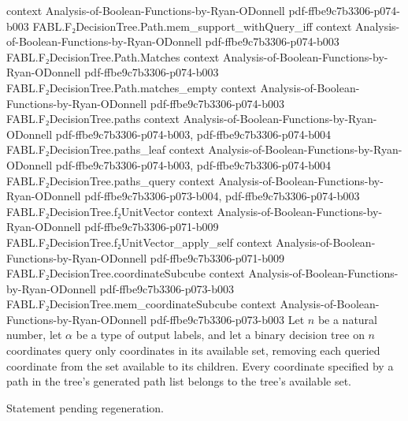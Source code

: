 \begin{theorem}
  {context}
  {Analysis-of-Boolean-Functions-by-Ryan-ODonnell}
  {pdf-ffbe9c7b3306-p074-b003}
\proofstep
  {FABL.F₂DecisionTree.Path.mem_support_withQuery_iff}
  {context}
  {Analysis-of-Boolean-Functions-by-Ryan-ODonnell}
  {pdf-ffbe9c7b3306-p074-b003}
\proofstep
  {FABL.F₂DecisionTree.Path.Matches}
  {context}
  {Analysis-of-Boolean-Functions-by-Ryan-ODonnell}
  {pdf-ffbe9c7b3306-p074-b003}
\proofstep
  {FABL.F₂DecisionTree.Path.matches_empty}
  {context}
  {Analysis-of-Boolean-Functions-by-Ryan-ODonnell}
  {pdf-ffbe9c7b3306-p074-b003}
\proofstep
  {FABL.F₂DecisionTree.paths}
  {context}
  {Analysis-of-Boolean-Functions-by-Ryan-ODonnell}
  {pdf-ffbe9c7b3306-p074-b003,
    pdf-ffbe9c7b3306-p074-b004}
\proofstep
  {FABL.F₂DecisionTree.paths_leaf}
  {context}
  {Analysis-of-Boolean-Functions-by-Ryan-ODonnell}
  {pdf-ffbe9c7b3306-p074-b003,
    pdf-ffbe9c7b3306-p074-b004}
\proofstep
  {FABL.F₂DecisionTree.paths_query}
  {context}
  {Analysis-of-Boolean-Functions-by-Ryan-ODonnell}
  {pdf-ffbe9c7b3306-p073-b004,
    pdf-ffbe9c7b3306-p074-b003}
\proofstep
  {FABL.F₂DecisionTree.f₂UnitVector}
  {context}
  {Analysis-of-Boolean-Functions-by-Ryan-ODonnell}
  {pdf-ffbe9c7b3306-p071-b009}
\proofstep
  {FABL.F₂DecisionTree.f₂UnitVector_apply_self}
  {context}
  {Analysis-of-Boolean-Functions-by-Ryan-ODonnell}
  {pdf-ffbe9c7b3306-p071-b009}
\proofstep
  {FABL.F₂DecisionTree.coordinateSubcube}
  {context}
  {Analysis-of-Boolean-Functions-by-Ryan-ODonnell}
  {pdf-ffbe9c7b3306-p073-b003}
\proofstep
  {FABL.F₂DecisionTree.mem_coordinateSubcube}
  {context}
  {Analysis-of-Boolean-Functions-by-Ryan-ODonnell}
  {pdf-ffbe9c7b3306-p073-b003}
Let $n$ be a natural number, let $\alpha$ be a type of output labels, and let a binary
decision tree on $n$ coordinates query only coordinates in its available set, removing
each queried coordinate from the set available to its children. Every coordinate
specified by a path in the tree's generated path list belongs to the tree's available
set.
\end{theorem}

\begin{theorem}
\leanok
{}
Statement pending regeneration.
\end{theorem}

